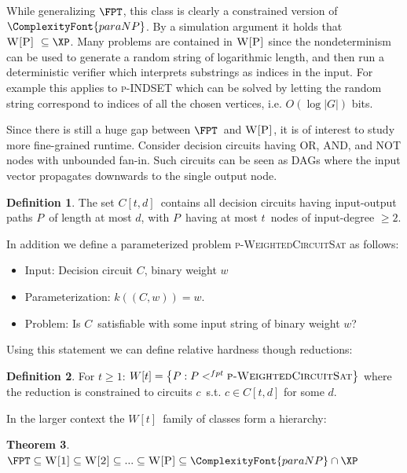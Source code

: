 \documentclass[a4paper,11pt]{report}
\theoremstyle{plain}
\newtheorem{thm}{Theorem}[chapter] %
\theoremstyle{definition}
\newtheorem{defn}[thm]{Definition} %
\newcommand{\PARANP}{\ComplexityFont{paraNP}}
\begin{document}
While generalizing $\FPT$, this class is clearly a constrained version of $\PARANP$.
By a simulation argument \cite{FG06} it holds that $\textsc{W[P]} \subseteq \XP$.
Many problems are contained in $\textsc{W[P]}$ since the nondeterminism can be used to generate a random string of logarithmic length, and then run a deterministic verifier which
interprets substrings as indices in the input.
For example this applies to \textsc{p-INDSET} which can be solved by letting the random string correspond to indices of all the chosen vertices, i.e. $O(\log |G|)$ bits.

Since there is still a huge gap between $\FPT$ and $\textsc{W[P]}$, it is of interest to study more fine-grained runtime.
Consider decision circuits having OR, AND, and NOT nodes with unbounded fan-in.
Such circuits can be seen as DAGs where the input vector propagates downwards to the single output node.

\begin{defn}
The set $C[t, d]$ contains all decision circuits having input-output paths $P$ of length at most $d$, with $P$ having at most $t$ nodes of input-degree $\ge 2$.
\end{defn}

In addition we define a parameterized problem \textsc{p-WeightedCircuitSat} as follows:
\begin{itemize}
\item Input: Decision circuit $C$, binary weight $w$
\item Parameterization: $k((C, w)) = w$.
\item Problem: Is $C$ satisfiable with some input string of binary weight $w$?
\end{itemize}

Using this statement we can define relative hardness though reductions:

\begin{defn}
For $t \ge 1$: $W[t] = \left\{P : P <^{fpt} \textsc{p-WeightedCircuitSat} \right\}$ where the reduction is constrained to circuits $c$ s.t. $c \in C[t, d]$ for some $d$.
\end{defn}


In the larger context the $W[t]$ family of classes form a hierarchy:

\begin{thm}
$\FPT \subseteq \textsc{W[1]} \subseteq \textsc{W[2]} \subseteq ...  \subseteq \textsc{W[P]} \subseteq \PARANP \cap \XP$
\end{thm}
\end{document}

